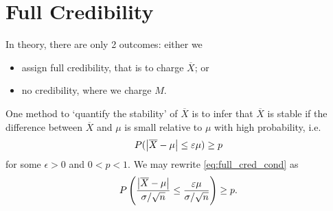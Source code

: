 \documentclass[notoc,notitlepage]{tufte-book}
\begin{document}

\section{Full Credibility}%
\label{sec:full_credibility}

In  theory, there are only 2 outcomes: either we
\begin{itemize}
  \item assign full credibility, that is to charge $\overline{X}$; or
  \item no credibility, where we charge $M$.
\end{itemize}
One method to `quantify the stability' of $\overline{X}$  is to infer
that $\overline{X}$ is stable if the difference between $\overline{X}$ and $\mu$
is small relative to $\mu$ with high probability, i.e.
\begin{equation}\label{eq:full_cred_cond}
  P(\left|\overline{X} - \mu\right| \leq \varepsilon \mu) \geq p
\end{equation}
for some $\epsilon > 0$ and $0 < p < 1$. We may rewrite
\cref{eq:full_cred_cond} as
\begin{equation*}
  P \left( \frac{\left|\overline{X} - \mu\right|}{\sigma / \sqrt{n}} \leq
  \frac{\varepsilon\mu}{\sigma / \sqrt{n}} \right) \geq p.
\end{equation*}
\end{document}
